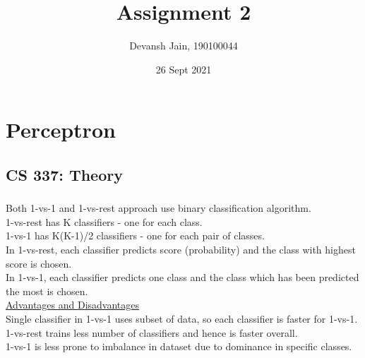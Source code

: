 \documentclass[12pt, fleqn]{article}
\title{Assignment 2}
\author{Devansh Jain, 190100044}
\date{26 Sept 2021}
\begin{document}
\maketitle
\tableofcontents
\thispagestyle{empty}
\setcounter{page}{0}

\newpage
\section{Perceptron}
\subsection{CS 337: Theory}
\subsubsection{}
Both 1-vs-1 and 1-vs-rest approach use binary classification algorithm. \\
1-vs-rest has K classifiers - one for each class. \\
1-vs-1 has K(K-1)/2 classifiers - one for each pair of classes. \\
In 1-vs-rest, each classifier predicts score (probability) and the class with highest score is chosen. \\
In 1-vs-1, each classifier predicts one class and the class which has been predicted the most is chosen. \\

\underline{Advantages and Disadvantages} \\
Single classifier in 1-vs-1 uses subset of data, so each classifier is faster for 1-vs-1. \\
1-vs-rest trains less number of classifiers and hence is faster overall. \\
1-vs-1 is less prone to imbalance in dataset due to dominance in specific classes.
\end{document}
